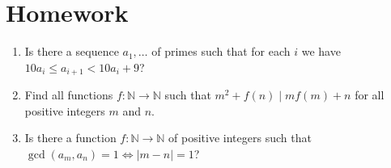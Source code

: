 \documentclass{article}
\newcommand\Nn{\mathbb{N}}
\begin{document}
\section{Homework}
\begin{enumerate}
	\item Is there a sequence $a_1,\ldots$ of primes such that for each $i$ we
	      have $10 a_i\le a_{i+1}<10a_i+9$?
	\item Find all functions $f:\Nn\to\Nn$ such that $m^2+f(n)\mid
		      mf(m)+n$ for all positive integers $m$ and $n$.
	\item Is there a function $f:\Nn\to\Nn$ of positive integers such that
	      $\gcd(a_m,a_n)=1\iff |m-n|=1$?
\end{enumerate}
\end{document}
